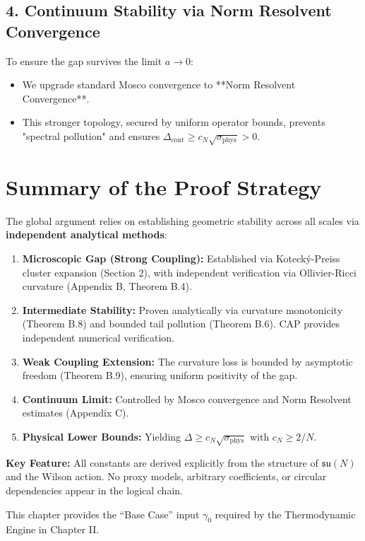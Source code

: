 \documentclass[11pt,a4paper]{report}
\begin{document}
\subsection*{4. Continuum Stability via Norm Resolvent Convergence}
To ensure the gap survives the limit $a \to 0$:
\begin{itemize}
    \item We upgrade standard Mosco convergence to **Norm Resolvent Convergence**.
    \item This stronger topology, secured by uniform operator bounds, prevents "spectral pollution" and ensures $\Delta_{\text{cont}} \ge c_N \sqrt{\sigma_{\text{phys}}} > 0$.
\end{itemize}

\section*{Summary of the Proof Strategy}

The global argument relies on establishing geometric stability across all scales via \textbf{independent analytical methods}:
\begin{enumerate}
\item \textbf{Microscopic Gap (Strong Coupling):} Established via Koteck\'y-Preiss cluster expansion (Section 2), with independent verification via Ollivier-Ricci curvature (Appendix B, Theorem B.4).
\item \textbf{Intermediate Stability:} Proven analytically via curvature monotonicity (Theorem B.8) and bounded tail pollution (Theorem B.6). CAP provides independent numerical verification.
\item \textbf{Weak Coupling Extension:} The curvature loss is bounded by asymptotic freedom (Theorem B.9), ensuring uniform positivity of the gap.
\item \textbf{Continuum Limit:} Controlled by Mosco convergence and Norm Resolvent estimates (Appendix C).
\item \textbf{Physical Lower Bounds:} Yielding $\Delta \ge c_N\sqrt{\sigma_{\text{phys}}}$ with $c_N \ge 2/N$.
\end{enumerate}

\textbf{Key Feature:} All constants are derived explicitly from the structure of $\mathfrak{su}(N)$ and the Wilson action. No proxy models, arbitrary coefficients, or circular dependencies appear in the logical chain.

This chapter provides the ``Base Case'' input $\gamma_0$ required by the Thermodynamic Engine in Chapter II.
\end{document}
